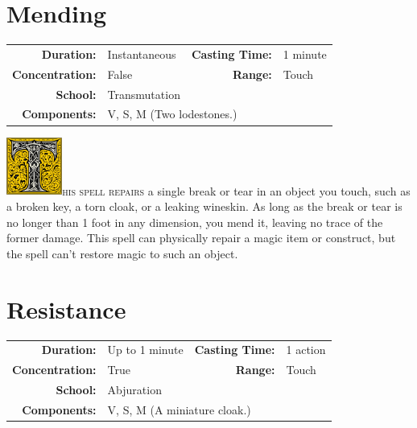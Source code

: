 \documentclass[12pt,showtrims]{memoir}
\begin{document}
\section*{Mending}

{
\small\centering\vspace{-6pt}
\begin{tabular}{rlrl}
\toprule

\textbf{Duration:} & Instantaneous &
\textbf{Casting Time:} & 1 minute \\
\textbf{Concentration:} & False &
\textbf{Range:} & Touch \\
\textbf{School:} & Transmutation \\
\textbf{Components:} & \multicolumn{3}{p{0.7\textwidth}}{V, S, M (Two lodestones.)}\\

\bottomrule
\end{tabular}
}

\vspace{1\baselineskip}\noindent 
\lettrine[lines=4]{\includegraphics[height=54pt]{initials/T.png}}{his spell repairs } a single break or tear in an object you touch, such as a broken key, a torn cloak, or a leaking wineskin. As long as the break or tear is no longer than 1 foot in any dimension, you mend it, leaving no trace of the former damage. This spell can physically repair a magic item or construct, but the spell can't restore magic to such an object.

\newpage
\section*{Resistance}

{
\small\centering\vspace{-6pt}
\begin{tabular}{rlrl}
\toprule

\textbf{Duration:} & Up to 1 minute &
\textbf{Casting Time:} & 1 action \\
\textbf{Concentration:} & True &
\textbf{Range:} & Touch \\
\textbf{School:} & Abjuration \\
\textbf{Components:} & \multicolumn{3}{p{0.7\textwidth}}{V, S, M (A miniature cloak.)}\\

\bottomrule
\end{tabular}
}
\end{document}
